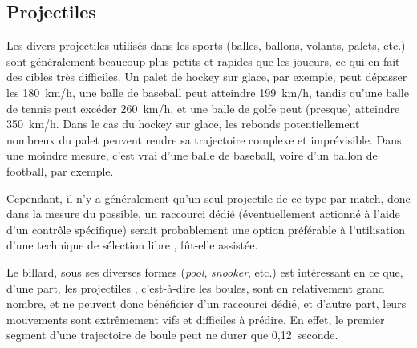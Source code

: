 	
	\FloatBarrier \subsection{Projectiles}
	Les divers projectiles utilisés dans les sports (balles, ballons, volants, palets, etc.) sont généralement beaucoup plus petits et rapides que les joueurs, ce qui en fait des cibles très difficiles. Un palet de hockey sur glace, par exemple, peut dépasser les 180~km/h\footnotemark{}, une balle de baseball peut atteindre 199~km/h\footnotemark{}, tandis qu'une balle de tennis peut excéder 260~km/h\footnotemark{}, et une balle de golfe peut (presque) atteindre 350~km/h\footnotemark{}. Dans le cas du hockey sur glace, les rebonds potentiellement nombreux du palet peuvent rendre sa trajectoire complexe et imprévisible. Dans une moindre mesure, c'est vrai d'une balle de baseball, voire d'un ballon de football, par exemple.
	
	Cependant, il n'y a généralement qu'un seul projectile de ce type par match, donc dans la mesure du possible, un raccourci dédié (éventuellement actionné à l'aide d'un contrôle spécifique) serait probablement une option préférable à l'utilisation d'une technique de sélection \og libre \fg{}, fût-elle assistée.
	
	\addtocounter{footnote}{-3}
	
	\addtocounter{footnote}{1}
	
	\addtocounter{footnote}{1}
	
	\addtocounter{footnote}{1}
	
	Le billard, sous ses diverses formes (\emph{pool}, \emph{snooker}, etc.) est intéressant en ce que, d'une part, les \og projectiles \fg{}, c'est-à-dire les boules, sont en relativement grand nombre, et ne peuvent donc bénéficier d'un raccourci dédié, et d'autre part, leurs mouvements sont extrêmement vifs et difficiles à prédire. En effet, le premier segment d'une trajectoire de boule peut ne durer que 0,12~seconde\footnotemark{}.
	
